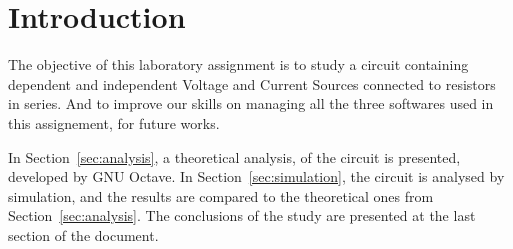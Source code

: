 \section{Introduction}
\label{sec:introduction}


The objective of this laboratory assignment is to study a circuit containing dependent and independent Voltage and Current Sources connected to resistors in series. And to improve our skills on managing all the three softwares used in this assignement, for future works.
\vspace{1cm}


In Section~\ref{sec:analysis}, a theoretical analysis, of the circuit is presented, developed by GNU Octave. In Section~\ref{sec:simulation}, the circuit is analysed by
simulation, and the results are compared to the theoretical ones from
Section~\ref{sec:analysis}. The conclusions of the study are presented at the last section of the document.
